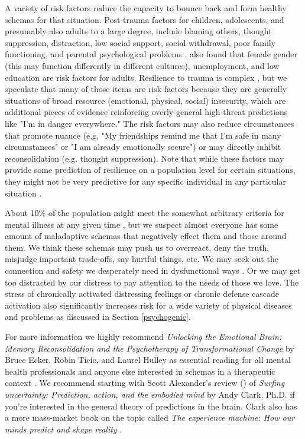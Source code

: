\documentclass[12pt,letterpaper]{book}
\begin{document}
A variety of risk factors reduce the capacity to bounce back and form healthy schemas for that situation. Post-trauma factors for children, adolescents, and presumably also adults to a large degree, include blaming others, thought suppression, distraction, low social support, social withdrawal, poor family functioning, and parental psychological problems \cite{trickeyRiskFactors}. \cite{tangRiskFactors} also found that female gender (this may function differently in different cultures), unemployment, and low education are risk factors for adults. Resilience to trauma is complex \cite{bonanno2008loss}, but we speculate that many of those items are risk factors because they are generally situations of broad resource (emotional, physical, social) insecurity, which are additional pieces of evidence reinforcing overly-general high-threat predictions like "I'm in danger everywhere." The risk factors may also reduce circumstances that promote nuance (e.g. "My friendships remind me that I'm safe in many circumstances" or "I am already emotionally secure") or may directly inhibit reconsolidation (e.g. thought suppression). Note that while these factors may provide some prediction of resilience on a population level for certain situations, they might not be very predictive for any specific individual in any particular situation \cite{bonannoRelilienceParadox}.

About 10\% of the population might meet the somewhat arbitrary criteria for mental illness at any given time \cite{whoMentalHealth}, but we suspect almost everyone has some amount of maladaptive schemas that negatively effect them and those around them. We think these schemas may push us to overreact, deny the truth, misjudge important trade-offs, say hurtful things, etc. We may seek out the connection and safety we desperately need in dysfunctional ways \cite{brownAttachmentDisturbances}. Or we may get too distracted by our distress to pay attention to the needs of those we love. The stress of chronically activated distressing feelings or chronic defense cascade activation also significantly increases risk for a wide variety of physical diseases and problems as discussed in Section \ref{psychogenic}.

For more information we highly recommend \textit{Unlocking the Emotional Brain: Memory Reconsolidation and the Psychotherapy of Transformational Change} by Bruce Ecker, Robin Ticic, and Laurel Hulley as essential reading for all mental health professionals and anyone else interested in schemas in a therapeutic context \cite{eckerUnlocking}. We recommend starting with Scott Alexander's review (\textcite{clark2015surfing}) of \textit{Surfing uncertainty: Prediction, action, and the embodied mind} by Andy Clark, Ph.D. if you're interested in the general theory of predictions in the brain. Clark also has a more mass-market book on the topic called \textit{The experience machine: How our minds predict and shape reality} \cite{clark2024experience}.
\end{document}
